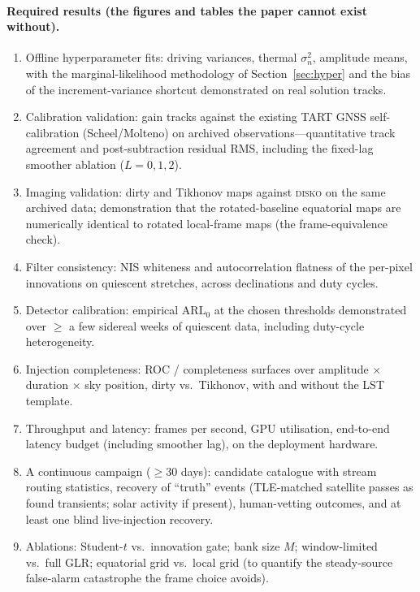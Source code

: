 \documentclass[11pt]{article}
\begin{document}
\paragraph{Required results (the figures and tables the paper cannot exist without).}
\begin{enumerate}[leftmargin=*]
  \item Offline hyperparameter fits: driving variances, thermal $\sigma_n^2$, amplitude means,
        with the marginal-likelihood methodology of Section~\ref{sec:hyper} and the bias of the
        increment-variance shortcut demonstrated on real solution tracks.
  \item Calibration validation: gain tracks against the existing TART GNSS self-calibration
        (Scheel/Molteno) on archived observations---quantitative track agreement and post-subtraction
        residual RMS, including the fixed-lag smoother ablation ($L=0,1,2$).
  \item Imaging validation: dirty and Tikhonov maps against \textsc{disko} on the same archived
        data; demonstration that the rotated-baseline equatorial maps are numerically identical to
        rotated local-frame maps (the frame-equivalence check).
  \item Filter consistency: NIS whiteness and autocorrelation flatness of the per-pixel innovations
        on quiescent stretches, across declinations and duty cycles.
  \item Detector calibration: empirical $\mathrm{ARL}_0$ at the chosen thresholds demonstrated over
        $\ge$ a few sidereal weeks of quiescent data, including duty-cycle heterogeneity.
  \item Injection completeness: ROC / completeness surfaces over amplitude $\times$ duration
        $\times$ sky position, dirty vs.\ Tikhonov, with and without the LST template.
  \item Throughput and latency: frames per second, GPU utilisation, end-to-end latency budget
        (including smoother lag), on the deployment hardware.
  \item A continuous campaign ($\ge$30 days): candidate catalogue with stream routing statistics,
        recovery of ``truth'' events (TLE-matched satellite passes as found transients; solar
        activity if present), human-vetting outcomes, and at least one blind live-injection
        recovery.
  \item Ablations: Student-$t$ vs.\ innovation gate; bank size $M$; window-limited vs.\ full GLR;
        equatorial grid vs.\ local grid (to quantify the steady-source false-alarm catastrophe the
        frame choice avoids).
\end{enumerate}
\end{document}
